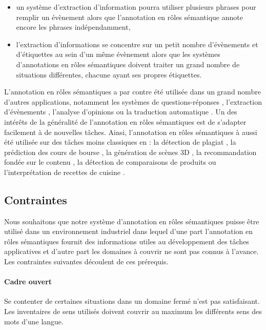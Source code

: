 \begin{itemize}
    \item un système d'extraction d'information pourra utiliser plusieurs
        phrases pour remplir un évènement alors que l'annotation en rôles
        sémantique annote encore les phrases indépendamment,
    \item l'extraction d'informations se concentre sur un petit nombre
        d'évènements et d'étiquettes au sein d'un même évènement alors que les
        systèmes d'annotations en rôles sémantiques doivent traiter un grand
        nombre de situations différentes, chacune ayant ses propres étiquettes.
\end{itemize}

L'annotation en rôles sémantiques a par contre été utilisée dans un grand
nombre d'autres applications, notamment les systèmes de questions-réponses
\citep{shen2007using}, l'extraction d'évènements \citep{exner2011using},
l'analyse d'opinions \citep{das2012structure} ou la traduction automatique
\citep{bazrafshan2013semantic,bazrafshan2014comparing}. Un des intérêts de la
généralité de l'annotation en rôles sémantiques est de s'adapter facilement à
de nouvelles tâches. Ainsi, l'annotation en rôles sémantiques à aussi été
utilisée sur des tâches moins classiques en : la détection de plagiat
\citep{osman2012improved}, la prédiction des cours de bourse
\citep{xie2013semantic}, la génération de scènes 3D \citep{chang2014learning},
la recommandation fondée sur le contenu \citep{de2014exploiting}, la détection
de comparaisons de produits \citep{kessler2013detection} ou l'interprétation de
recettes de cuisine \citep{malmaud2014cooking}.

\subsection{Contraintes}

Nous souhaitons que notre système d'annotation en rôles sémantiques puisse être
utilisé dans un environnement industriel dans lequel d'une part l'annotation en
rôles sémantiques fournit des informations utiles au développement des tâches
applicatives et d'autre part les domaines à couvrir ne sont pas connus à
l'avance. Les contraintes suivantes découlent de ces prérequis.

\paragraph{Cadre ouvert} Se contenter de certaines situations dans un domaine
fermé n'est pas satisfaisant. Les inventaires de sens utilisés doivent couvrir
au maximum les différents sens des mots d'une langue.

